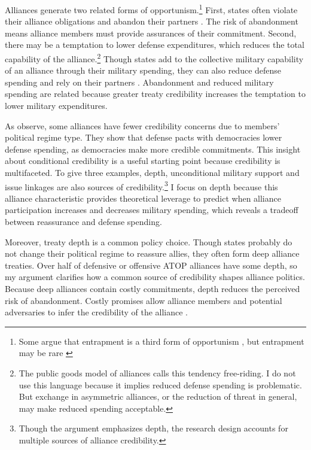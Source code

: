 \documentclass[12pt]{article}
\begin{document}
Alliances generate two related forms of opportunism.\footnote{Some argue that entrapment is a third form of opportunism \citep{Snyder1984}, but entrapment may be rare \citep{Kim2011, Beckley2015}}
First, states often violate their alliance obligations and abandon their partners \citep{BerkemeierFuhrmann2018}.
The risk of abandonment means alliance members must provide assurances of their commitment. 
Second, there may be a temptation to lower defense expenditures, which reduces the total capability of the alliance.\footnote{The public goods model of alliances calls this tendency free-riding. I do not use this language because it implies reduced defense spending is problematic. But exchange in asymmetric alliances, or the reduction of threat in general, may make reduced spending acceptable.}
Though states add to the collective military capability of an alliance through their military spending, they can also reduce defense spending and rely on their partners \citep{OlsonZeckhauser1966, Morrow1993, Conybeare1994, SandlerHartley2001}.
Abandonment and reduced military spending are related because greater treaty credibility increases the temptation to lower military expenditures. 


As \citet{DigiuseppePoast2016} observe, some alliances have fewer credibility concerns due to members' political regime type.
They show that defense pacts with democracies lower defense spending, as democracies make more credible commitments.
This insight about conditional credibility is a useful starting point because credibility is multifaceted. 
To give three examples, depth, unconditional military support \citep{Benson2012, Chibaetal2015} and issue linkages \citep{LongLeeds2006, Poast2012, Poast2013} are also sources of credibility.\footnote{Though the argument emphasizes depth, the research design accounts for multiple sources of alliance credibility.} 
I focus on depth because this alliance characteristic provides theoretical leverage to predict when alliance participation increases and decreases military spending, which reveals a tradeoff between reassurance and defense spending.  


Moreover, treaty depth is a common policy choice. 
Though states probably do not change their political regime to reassure allies, they often form deep alliance treaties. 
Over half of defensive or offensive ATOP alliances have some depth, so my argument clarifies how a common source of credibility shapes alliance politics. 
Because deep alliances contain costly commitments, depth reduces the perceived risk of abandonment.  
Costly promises allow alliance members and potential adversaries to infer the credibility of the alliance \citep{Leeds2003, FuhrmannSechser2014}. 
\end{document}
